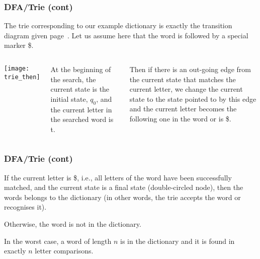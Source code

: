 % 
\begin{frame}
\frametitle{DFA/Trie (cont)}

The trie corresponding to our example dictionary is exactly the
transition diagram given page~\pageref{trie_then}. Let us assume here
that the word is followed by a special marker \textsf{\$}.

\bigskip

\begin{columns}
    \begin{center}
      \texttt{[image: trie\_then]}
    \end{center}

   At the beginning of the search, the current
  state is the initial state, \(q_0\), and the current letter in the
  searched word is \textsf{t}.

  \bigskip

  Then if there is an out-going edge from the current state that
  matches the current letter, we change the current state to the state
  pointed to by this edge and the current letter becomes the following
  one in the word or is \textsf{\$}.
\end{columns}

\end{frame}

% 
\begin{frame}
\frametitle{DFA/Trie (cont)}

If the current letter is \textsf{\$}, i.e., all letters of the word
have been successfully matched, and the current state is a final state
(double-circled node), then the words belongs to the dictionary (in
other words, the trie accepts the word or recognises it).

\bigskip

Otherwise, the word is not in the dictionary.

\bigskip

In the worst case, a word of length \(n\) is in the dictionary and it
is found in exactly \(n\) letter comparisons.

\end{frame}

